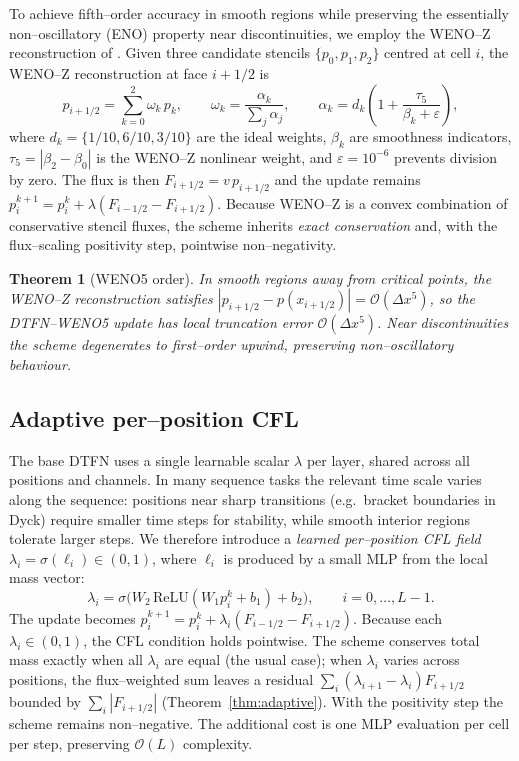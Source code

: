\documentclass[10pt]{article}
\newtheorem{theorem}{Theorem}
\theoremstyle{definition}
\theoremstyle{remark}
\newcommand{\Eps}{\varepsilon}
\begin{document}
To achieve fifth--order accuracy in smooth regions while preserving
the essentially non--oscillatory (ENO) property near discontinuities,
we employ the WENO--Z reconstruction of \cite{borges2008improved}.
Given three candidate stencils $\{p_0, p_1, p_2\}$ centred at cell
$i$, the WENO--Z reconstruction at face $i+1/2$ is
\[
  p_{i+1/2} = \sum_{k=0}^{2} \omega_k\, p_k,
  \qquad
  \omega_k = \frac{\alpha_k}{\sum_j \alpha_j},
  \qquad
  \alpha_k = d_k\!\left(1 + \frac{\tau_5}{\beta_k + \Eps}\right),
\]
where $d_k = \{1/10, 6/10, 3/10\}$ are the ideal weights, $\beta_k$
are smoothness indicators, $\tau_5 = |\beta_2 - \beta_0|$ is the
WENO--Z nonlinear weight, and $\Eps = 10^{-6}$ prevents division by
zero.  The flux is then $F_{i+1/2} = v\, p_{i+1/2}$ and the update
remains $p^{k+1}_i = p^k_i + \lambda(F_{i-1/2} - F_{i+1/2})$.
Because WENO--Z is a convex combination of conservative stencil
fluxes, the scheme inherits \emph{exact conservation} and, with the
flux--scaling positivity step, pointwise non--negativity.

\begin{theorem}[WENO5 order]
  \label{thm:weno5}
  In smooth regions away from critical points, the WENO--Z
  reconstruction satisfies $|p_{i+1/2} - p(x_{i+1/2})| =
  \mathcal{O}(\Delta x^5)$, so the DTFN--WENO5 update has local
  truncation error $\mathcal{O}(\Delta x^5)$.  Near discontinuities
  the scheme degenerates to first--order upwind, preserving
  non--oscillatory behaviour.
\end{theorem}

\subsection{Adaptive per--position CFL}
\label{sec:adaptive}

The base DTFN uses a single learnable scalar $\lambda$ per layer,
shared across all positions and channels.  In many sequence tasks the
relevant time scale varies along the sequence: positions near sharp
transitions (e.g.\ bracket boundaries in Dyck) require smaller time
steps for stability, while smooth interior regions tolerate larger
steps.  We therefore introduce a \emph{learned per--position CFL
field} $\lambda_i = \sigma(\ell_i) \in (0,1)$, where $\ell_i$ is
produced by a small MLP from the local mass vector:
\[
  \lambda_i = \sigma\!\bigl(W_2\, \mathrm{ReLU}(W_1 p^k_i + b_1) + b_2\bigr),
  \qquad i = 0, \dots, L-1.
\]
The update becomes $p^{k+1}_i = p^k_i + \lambda_i (F_{i-1/2} - F_{i+1/2})$.
Because each $\lambda_i \in (0,1)$, the CFL condition holds
pointwise.  The scheme conserves total mass exactly when all
$\lambda_i$ are equal (the usual case); when $\lambda_i$ varies
across positions, the flux--weighted sum leaves a residual
$\sum_i (\lambda_{i+1} - \lambda_i) F_{i+1/2}$ bounded by
$\sum_i |F_{i+1/2}|$ (Theorem~\ref{thm:adaptive}).  With the
positivity step the scheme remains non--negative.  The additional
cost is one MLP evaluation per cell per step, preserving
$\mathcal{O}(L)$ complexity.
\end{document}
